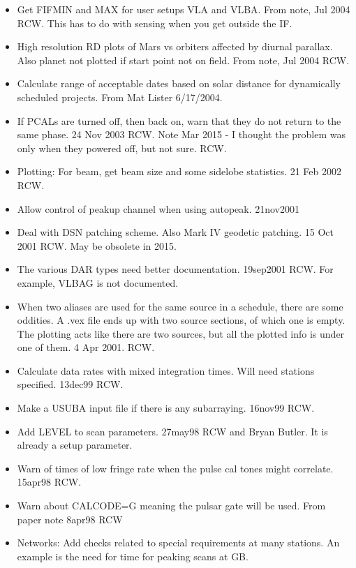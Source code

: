 \documentclass{report}
\begin{document}
\begin{itemize}
\item Get FIFMIN and MAX for user setups VLA and VLBA.  From note, Jul
      2004 RCW.  This has to do with sensing when you get outside the
      IF.

\item High resolution RD plots of Mars vs orbiters affected by
      diurnal parallax.  Also planet not plotted if start point not on
      field.  From note, Jul 2004  RCW.

\item Calculate range of acceptable dates based on solar distance for
      dynamically scheduled projects.  From Mat Lister 6/17/2004.

\item If PCALs are turned off, then back on, warn that they do not
      return to the same phase.  24 Nov 2003 RCW.  Note Mar 2015 - 
      I thought the problem was only when they powered off, but not
      sure.  RCW.

\item Plotting:  For beam, get beam size and some sidelobe statistics.
      21 Feb 2002 RCW.

\item Allow control of peakup channel when using autopeak.  21nov2001

\item Deal with DSN patching scheme.  Also Mark IV geodetic patching.
      15 Oct 2001  RCW.  May be obsolete in 2015.

\item The various DAR types need better documentation.  19sep2001 RCW.
      For example, VLBAG is not documented.

\item When two aliases are used for the same source in a schedule, there
      are some oddities.  A .vex file ends up with two source sections,
      of which one is empty.  The plotting acts like there are two sources,
      but all the plotted info is under one of them.  4 Apr 2001.  RCW.

\item Calculate data rates with mixed integration times.  Will need
      stations specified.  13dec99 RCW.

\item Make a USUBA input file if there is any subarraying.
      16nov99 RCW.

\item Add LEVEL to scan parameters.  27may98 RCW and Bryan Butler.
      It is already a setup parameter.

\item Warn of times of low fringe rate when the pulse cal tones
      might correlate.  15apr98  RCW.

\item Warn about CALCODE=G meaning the pulsar gate will be used.
      From paper note  8apr98 RCW

\item Networks:  Add checks related to special requirements at many stations.
      An example is the need for time for peaking scans at GB.

\end{itemize}
\end{document}
